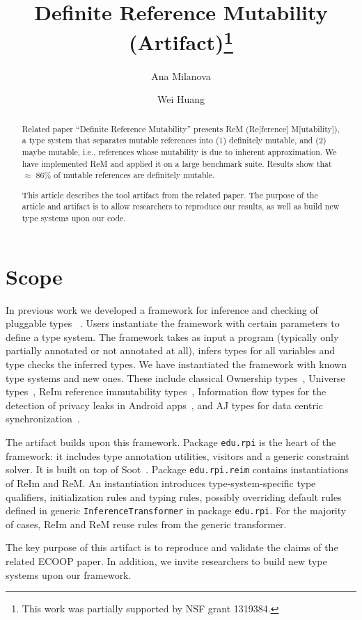 \documentclass[a4paper,UKenglish]{darts-v2018}
\title{Definite Reference Mutability (Artifact)\footnote{This work was partially supported by NSF grant 1319384.}}
\author{Ana Milanova}{Department of Computer Science, Rensselaer Polytechnic Institute\\{110 8th Street, Troy NY, USA}}{milanova@cs.rpi.edu}{}{}
\author{Wei Huang}{Google}{huangwe@google.com}{}{Work done while author was a PhD student at Rensselear Polytechnic Institute.}
\newenvironment{scope}{\section{Scope}}{}
\begin{document}
\maketitle

\begin{abstract}

Related paper ``Definite Reference Mutability'' presents 
ReM (Re[ference] M[utability]), a type system
that separates mutable references into (1) definitely mutable, 
and (2) maybe mutable, i.e., references whose mutability is due to inherent 
approximation. We have implemented ReM and applied it on a large benchmark 
suite. Results show that $\approx$ 86\% of mutable references 
are definitely mutable. 

This article describes the tool artifact from the related paper. The purpose of 
the article and artifact is to allow researchers to reproduce our results, as well as build new 
type systems upon our code.
\end{abstract}

\begin{scope}

In previous work we developed a framework for inference and checking of pluggable types
~\cite{Huang:2012a, Huang2014Thesis}. Users instantiate the framework with certain 
parameters to define a type system. The framework takes as input a program (typically only 
partially annotated or not annotated at all), infers types for all variables and type checks the 
inferred types. We have instantiated the framework with known type systems and new ones.
These include classical Ownership types~\cite{Clarke:1998,Huang:2012a}, 
Universe types~\cite{Dietl:2005,Huang:2012a}, ReIm reference immutability types~\cite{Huang:2012b}, 
Information flow types for the detection of privacy leaks in Android apps~\cite{Huang2015},
and AJ types for data centric synchronization~\cite{Vaziri:2010,Dolby:2012,Huang2012FOOL}.

The artifact builds upon this framework. Package \texttt{edu.rpi} is the heart of the framework: it includes
type annotation utilities, visitors and a generic constraint solver. It is built on top of 
Soot~\cite{Vallee-Rai1999}. Package \texttt{edu.rpi.reim} contains instantiations of ReIm and ReM. 
An instantiation introduces type-system-specific type qualifiers, initialization rules and typing rules,
possibly overriding default rules defined in generic \texttt{InferenceTransformer} in package \texttt{edu.rpi}. 
For the majority of cases, ReIm and ReM reuse rules from the generic transformer. 

The key purpose of this artifact is to reproduce and validate the claims of the related ECOOP paper.
In addition, we invite researchers to build new type systems upon our framework.

\end{scope}
\end{document}
